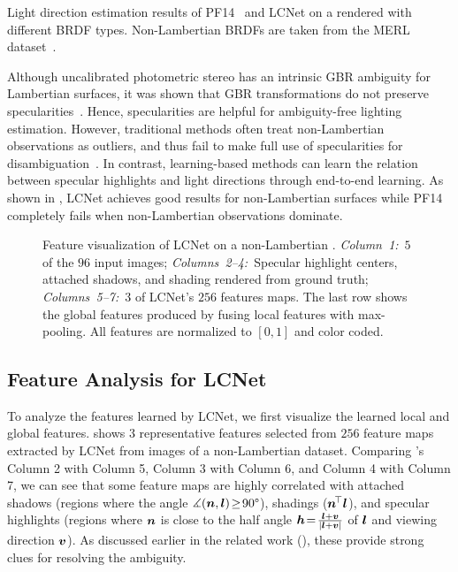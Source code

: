 \begin{table}[t] \centering
    \caption[Results of PF14 and LCNet on a  rendered with different BRDFs]{Light direction estimation results of PF14~\cite{papad14closed} and LCNet on a  rendered with different BRDF types. Non-Lambertian BRDFs are taken from the MERL dataset~\cite{matusik2003merl}.} \label{tab:res_sphere_brdfs}
    
\end{table}

Although uncalibrated photometric stereo has an intrinsic GBR ambiguity for Lambertian surfaces, it was shown that GBR transformations do not preserve specularities~\cite{belhumeur1999bas,georghiades2003incorporating,drbohlav2005can}. Hence, specularities are helpful for ambiguity-free lighting estimation.
However, traditional methods often treat non-Lambertian observations as outliers, and thus fail to %
make full use of specularities for disambiguation~\cite{papad14closed}.
In contrast, learning-based methods can learn the relation between specular highlights and light directions through end-to-end learning.
As shown in , LCNet achieves good results for non-Lambertian surfaces while PF14 completely fails when non-Lambertian observations dominate.

\begin{figure}[htbp]\centering
	
    \caption[Feature visualization of \hbox{LCNet} on a non-Lambertian ]{Feature visualization of \hbox{LCNet} on a non-Lambertian . \emph{Column~1:}~$5$ of the $96$ input images; \emph{Columns~2--4:}~Specular high\-light centers, attached shadows, and shading rendered from ground truth; \emph{Columns~5--7:}~$3$ of LCNet's $256$ features maps. The last row shows the global features produced by fusing local features with max-pooling. All features are normalized to $[0, 1]$ and color coded.} \label{fig:visualization}
\end{figure}

\subsection{Feature Analysis for LCNet}
To analyze the features learned by LCNet, we first visualize the learned local and global features.  shows $3$ representative features selected from $256$ feature maps extracted by LCNet from images of a non-Lambertian  dataset. 
Comparing 's Column 2 with Column 5, Column 3 with Column 6, and Column 4 with Column 7, we can see that some feature maps are highly correlated with attached shadows (regions where the angle $\measuredangle(\boldsymbol{n},\boldsymbol{l})\!\ge\! 90\degree$), shadings ($\boldsymbol{n}^{\!\top}\boldsymbol{l}$), and specular highlights (regions where $\boldsymbol{n}$ is close to the half angle $\boldsymbol{h}\!=\!\frac{\boldsymbol{l}+\boldsymbol{v}}{\left\lvert\boldsymbol{l}+\boldsymbol{v}\right\rvert}$ of $\boldsymbol{l}$ and viewing direction $\boldsymbol{v}$). 
As discussed earlier in the related work (), these provide strong clues for resolving the ambiguity. %

